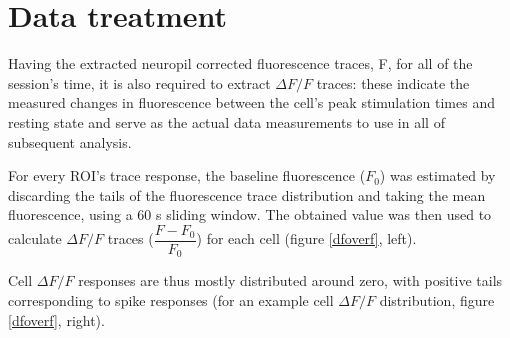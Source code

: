 \section{Data treatment}
\label{sec:DataTreatment}

Having the extracted neuropil corrected fluorescence traces, F, for all of the session's time, it is also required to extract $\Delta F/F$ traces: these indicate the measured changes in fluorescence between the cell's peak stimulation times and resting state and serve as the actual data measurements to use in all of subsequent analysis.

For every ROI's trace response, the baseline fluorescence ($F_0$) was estimated by discarding the tails of the fluorescence trace distribution and taking the mean fluorescence, using a 60 s sliding window. The obtained value was then used to calculate $\Delta F/F$ traces ($\dfrac{F-F_0}{F_0}$) for each cell (figure \ref{dfoverf}, left).

Cell  $\Delta F/F$ responses are thus mostly distributed around zero, with positive tails corresponding to spike responses (for an example cell $\Delta F/F$ distribution, figure \ref{dfoverf}, right).


